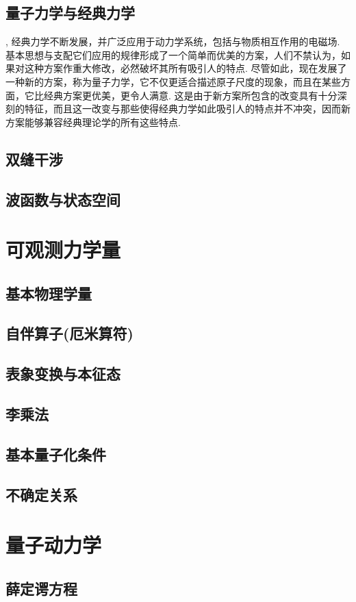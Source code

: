 \documentclass{book}
\begin{document}
\section{量子力学与经典力学}
, 经典力学不断发展，并广泛应用于动力学系统，包括与物质相互作用的电磁场. 基本思想与支配它们应用的规律形成了一个简单而优美的方案，人们不禁认为，如果对这种方案作重大修改，必然破坏其所有吸引人的特点. 尽管如此，现在发展了一种新的方案，称为量子力学，它不仅更适合描述原子尺度的现象，而且在某些方面，它比经典方案更优美，更令人满意. 这是由于新方案所包含的改变具有十分深刻的特征，而且这一改变与那些使得经典力学如此吸引人的特点并不冲突，因而新方案能够兼容经典理论学的所有这些特点.
\section{双缝干涉}
\section{波函数与状态空间}
\chapter{可观测力学量}
\section{基本物理学量}
\section{自伴算子(厄米算符)}
\section{表象变换与本征态}
\section{李乘法}
\section{基本量子化条件}
\section{不确定关系}
\chapter{量子动力学}
\section{薛定谔方程}
\end{document}
